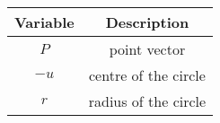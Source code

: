 \begin{tabular}[12pt]{ |c| c|}
    \hline
    \textbf{Variable} & \textbf{Description}\\ 
    \hline
    $P$ & point vector\\
    \hline 
    $-u$ & centre of the circle\\
    \hline
    $r$ & radius of the circle\\
    \hline 
    \end{tabular}

